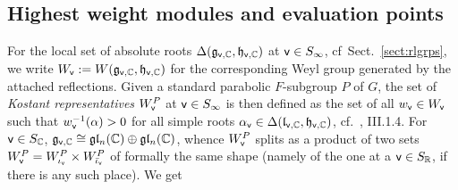 \documentclass[a4paper,10pt]{amsart}
\theoremstyle{definition}
\numberwithin{equation}{section}
\def\R{\mathbb R}
\def\C{\mathbb C}
\def\g{\mathfrak g}
\def\h{\mathfrak h}
\def\l{\mathfrak l}
\def\vv{{\sf v}} %
\begin{document}
\subsection{Highest weight modules and evaluation points}\label{sect:weylgrps}

For the local set of absolute roots $\Delta(\g_{\vv,\C},\h_{\vv,\C})$ at $\vv\in S_\infty$, cf\ Sect.\ \ref{sect:rlgrps}, we write $W_\vv:=W(\g_{\vv,\C},\h_{\vv,\C})$ for the corresponding Weyl group generated by the attached reflections. Given a standard parabolic $F$-subgroup $P$ of $G$, the set of {\it Kostant representatives} $W_\vv^{P}$ at $\vv\in S_\infty$ is then defined as the set of all $w_\vv\in W_\vv$ such that $w_\vv^{-1}(\alpha)>0$ for all simple roots $\alpha_\vv\in\Delta(\l_{\vv,\C},\h_{\vv,\C})$, cf.\ \cite{bowa}, III.1.4. For $\vv\in S_\C$, $\g_{\vv,\C}\cong \g\l_n(\C)\oplus \g\l_n(\C)$, whence $W_\vv^{P}$ splits as a product of two sets $W_\vv^{P}=W_{\iota_\vv}^{P}\times W_{\bar\iota_\vv}^{P}$ of formally the same shape (namely of the one at a $\vv\in S_\R$, if there is any such place). We get
\end{document}
